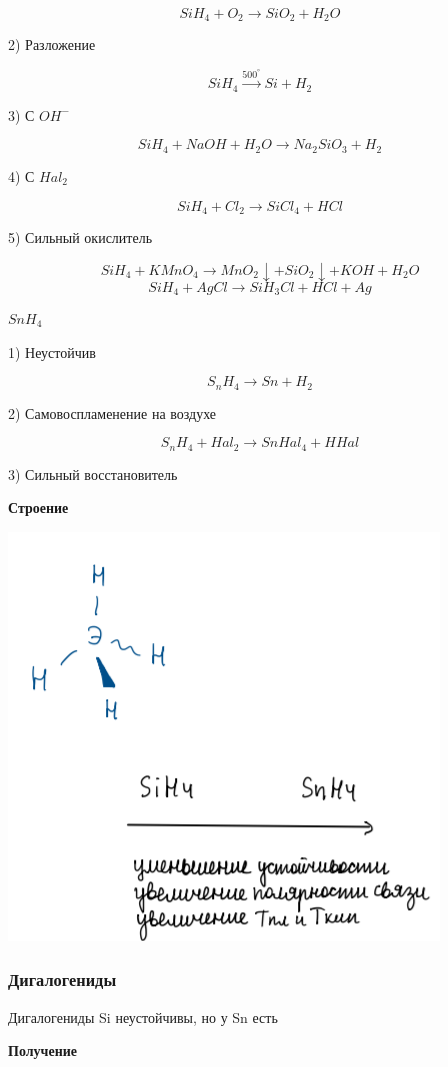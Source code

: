$$SiH_4 + O_2 \rightarrow SiO_2 + H_2O$$

2) Разложение

$$SiH_4 \xrightarrow{500^{\circ}} Si + H_2$$

3) С $OH^-$

$$SiH_4 + NaOH + H_2O \rightarrow Na_2SiO_3 + H_2$$

4) С $Hal_2$

$$SiH_4 + Cl_2 \rightarrow SiCl_4 + HCl$$

5) Сильный окислитель

$$SiH_4 + KMnO_4 \rightarrow MnO_2\downarrow + SiO_2\downarrow + KOH + H_2O$$
$$SiH_4 + AgCl \rightarrow SiH_3Cl + HCl + Ag$$

$SnH_4$

1) Неустойчив 

$$S_nH_4 \rightarrow Sn + H_2$$

2) Самовоспламенение на воздухе

$$S_nH_4 + Hal_2 \rightarrow SnHal_4 + HHal$$

3) Сильный восстановитель

\textbf{Строение}

\includegraphics{images/10v1.png}

\subsubsection*{Дигалогениды}

Дигалогениды Si неустойчивы, но у Sn есть

\textbf{Получение}

